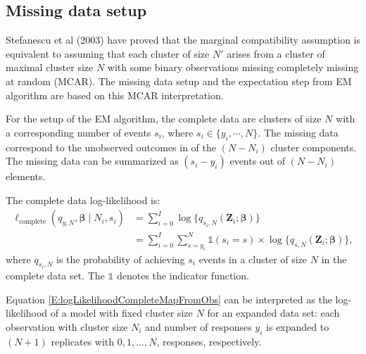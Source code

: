\documentclass[reqno]{amsart}
\begin{document}
\subsection{Missing data setup}
Stefanescu et al (2003) have proved that the marginal compatibility assumption is equivalent to assuming that each cluster of size $N'$ arises from a cluster of maximal cluster size $N$ with some binary observations missing completely missing at random (MCAR). The missing data setup and the expectation step from EM algorithm are based on this MCAR interpretation. 

For the setup of the EM algorithm, the complete data are clusters of size $N$ with a corresponding number of events $s_i$, where $s_i \in \{y_i, \cdots, N \}$. The missing data correspond to the unobserved outcomes in of the $(N - N_i)$ cluster components. The missing data can be summarized as $(s_i - y_i)$ events out of $(N - N_i)$ elements.

The complete data log-likelihood is:
\begin{equation}\label{E:logLikelihoodCompleteMapFromObs}
\begin{split}
    \ell_{\text{complete}} (q_{y,N}, \boldsymbol{\beta} \mid N_i,s_i) &= \sum_{i=0}^I \log \{ q_{s_i,N}(\boldsymbol{Z}_i; \boldsymbol{\beta}) \} \\
    &= \sum_{i=0}^I \sum_{s=y_i}^N {\mathds{1}}(s_i=s) \times \log \{ q_{s,N}(\boldsymbol{Z}_i; \boldsymbol{\beta}) \}, 
\end{split}
\end{equation}
where $q_{s_i,N}$ is the probability of achieving $s_i$ events in a cluster of size $N$ in the complete data set. The $\mathds{1}$ denotes the indicator function.


Equation \ref{E:logLikelihoodCompleteMapFromObs} can be interpreted as the log-likelihood of a model with fixed cluster size $N$ for an expanded data set: each observation with cluster size $N_i$ and number of responses $y_i$ is expanded to $(N+1)$ replicates with $0, 1, \ldots, N$, responses, respectively.
\end{document}
